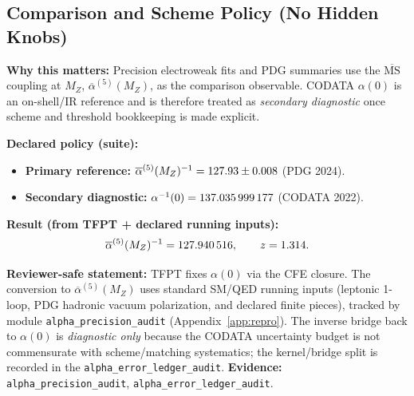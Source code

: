 \subsection{Comparison and Scheme Policy (No Hidden Knobs)}
\label{sec:comparison-policy}

\begin{tcolorbox}[colback=yellow!3, colframe=yellow!60!black,
    title={\textbf{Primary comparison observable: $\overline{\alpha}^{(5)}(M_Z)$ ($\overline{\mathrm{MS}}$)}}, fonttitle=\bfseries\small]
\textbf{Why this matters:} Precision electroweak fits and PDG summaries use the $\overline{\mathrm{MS}}$ coupling at $M_Z$, $\overline{\alpha}^{(5)}(M_Z)$, as the comparison observable. CODATA $\alpha(0)$ is an on-shell/IR reference and is therefore treated as \emph{secondary diagnostic} once scheme and threshold bookkeeping is made explicit.

\textbf{Declared policy (suite):}
\begin{itemize}[leftmargin=1.5em, topsep=2pt, itemsep=1pt]
    \item \textbf{Primary reference:} $\overline{\alpha}^{(5)}(M_Z)^{-1} = \num{\TFPTalphaBarFiveInvMZRefNum} \pm \num{\TFPTalphaBarFiveInvMZRefSigma}$ (PDG 2024).
    \item \textbf{Secondary diagnostic:} $\alpha^{-1}(0)=\num[round-mode=places,round-precision=9]{\TFPTalphaInvCODATANum}$ (CODATA 2022).
\end{itemize}

\textbf{Result (from TFPT + declared running inputs):}
\[
\overline{\alpha}^{(5)}(M_Z)^{-1}=\num[round-mode=places,round-precision=6]{\TFPTalphaBarFiveInvMZPredNum},
\qquad
z=\num[round-mode=places,round-precision=3]{\TFPTalphaBarFiveInvMZZ}.
\]

\textbf{Reviewer-safe statement:} TFPT fixes $\alpha(0)$ via the CFE closure. The conversion to $\overline{\alpha}^{(5)}(M_Z)$ uses standard SM/QED running inputs (leptonic 1-loop, PDG hadronic vacuum polarization, and declared finite pieces), tracked by module \texttt{alpha\_precision\_audit} (Appendix~\ref{app:repro}). The inverse bridge back to $\alpha(0)$ is \emph{diagnostic only} because the CODATA uncertainty budget is not commensurate with scheme/matching systematics; the kernel/bridge split is recorded in the \texttt{alpha\_error\_ledger\_audit}.
\textbf{Evidence:} \texttt{alpha\_precision\_audit}, \texttt{alpha\_error\_ledger\_audit}.
\end{tcolorbox}

